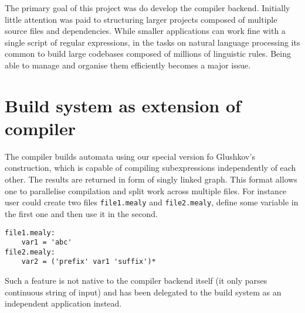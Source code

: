 The primary goal of this project was do develop the compiler backend. 
Initially little attention was paid to structuring larger projects composed of multiple source files and dependencies. While smaller applications can work fine with a single script of regular expressions, in the tasks on natural language processing its common to build large codebases composed of millions of linguistic rules. Being able to manage and organise them efficiently becomes a major issue. 

\section{Build system as extension of compiler}

The compiler builds automata using our special version fo Glushkov's construction, which is capable of compiling subexpressions independently of each other. The results are returned in form of singly linked graph. This format allows one to parallelise compilation and split work across multiple files. For instance user could create two files \texttt{file1.mealy} and \texttt{file2.mealy}, define some variable in the first one and then use it in the second.
\begin{lstlisting}
file1.mealy:
    var1 = 'abc'
file2.mealy:
    var2 = ('prefix' var1 'suffix')*
\end{lstlisting}
Such a feature is not native to the compiler backend itself (it only parses continuous string of input) and has been delegated to the build system as an independent application instead. 

